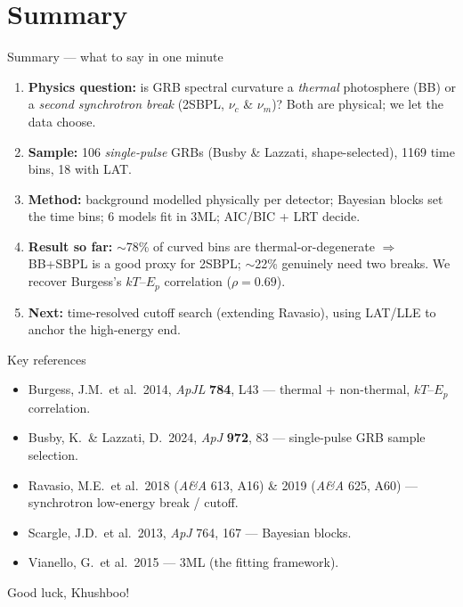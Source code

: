 \documentclass[aspectratio=169,11pt]{beamer}
\begin{document}
\section*{Summary}
\begin{frame}{Summary --- what to say in one minute}
\small
\begin{enumerate}
  \item \textbf{Physics question:} is GRB spectral curvature a \emph{thermal}
        photosphere (BB) or a \emph{second synchrotron break} (2SBPL,
        $\nu_c$ \& $\nu_m$)? Both are physical; we let the data choose.
  \item \textbf{Sample:} 106 \emph{single-pulse} GRBs (Busby \& Lazzati,
        shape-selected), 1169 time bins, 18 with LAT.
  \item \textbf{Method:} background modelled physically per detector; Bayesian
        blocks set the time bins; 6 models fit in 3ML; AIC/BIC + LRT decide.
  \item \textbf{Result so far:} $\sim$78\% of curved bins are thermal-or-degenerate
        $\Rightarrow$ BB+SBPL is a good proxy for 2SBPL; $\sim$22\% genuinely need
        two breaks. We recover Burgess's $kT$--$E_p$ correlation
        ($\rho = 0.69$).
  \item \textbf{Next:} time-resolved cutoff search (extending Ravasio), using
        LAT/LLE to anchor the high-energy end.
\end{enumerate}
\end{frame}

\begin{frame}{Key references}
\footnotesize
\begin{itemize}
  \item Burgess, J.M.\ et al.\ 2014, \emph{ApJL} \textbf{784}, L43 ---
        thermal + non-thermal, $kT$--$E_p$ correlation.
  \item Busby, K.\ \& Lazzati, D.\ 2024, \emph{ApJ} \textbf{972}, 83 ---
        single-pulse GRB sample selection.
  \item Ravasio, M.E.\ et al.\ 2018 (\emph{A\&A} 613, A16) \& 2019
        (\emph{A\&A} 625, A60) --- synchrotron low-energy break / cutoff.
  \item Scargle, J.D.\ et al.\ 2013, \emph{ApJ} 764, 167 --- Bayesian blocks.
  \item Vianello, G.\ et al.\ 2015 --- 3ML (the fitting framework).
\end{itemize}
\vspace{1em}
\centering\large Good luck, Khushboo!
\end{frame}
\end{document}
